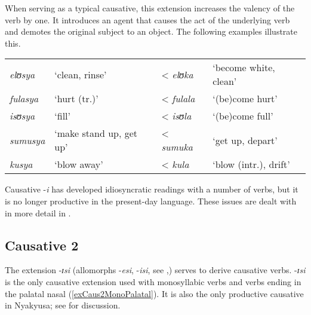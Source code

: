 When serving as a typical causative, this extension increases the valency of the verb by one. It introduces an agent that causes the act of the underlying verb and demotes the original subject to an object. The following examples illustrate this.
\begin{exe}
\ex
\begin{tabular}[t]{llll}
\textit{elʊsya} & \lq clean, rinse' & < \textit{elʊka} & \lq become white, clean'\\
\textit{fulasya} & \lq hurt (tr.)' & < \textit{fulala} & \lq (be)come hurt'\\
\textit{isʊsya} & \lq fill' & < \textit{isʊla} & \lq (be)come full'\\
\textit{sumusya} & \lq make stand up, get up' & < \textit{sumuka} & \lq get up, depart'\\
\textit{kusya} & \lq blow away' & < \textit{kula} & \lq blow (intr.), drift'
\end{tabular}
\end{exe}

Causative -\textit{i} has developed idiosyncratic readings with a number of verbs, but it is no longer productive in the present-day language. These issues are dealt with in more detail in .
\subsection{Causative 2}\label{Causative2}
The extension -\textit{ɪsi} (allomorphs -\textit{esi}, -\textit{isi}, see ,) serves to derive causative verbs. \mbox{-\textit{ɪsi}} is the only causative extension used with monosyllabic verbs and verbs ending in the palatal nasal (\ref{exCaus2MonoPalatal}). It is also the only productive causative in Nyakyusa; see  for discussion.

